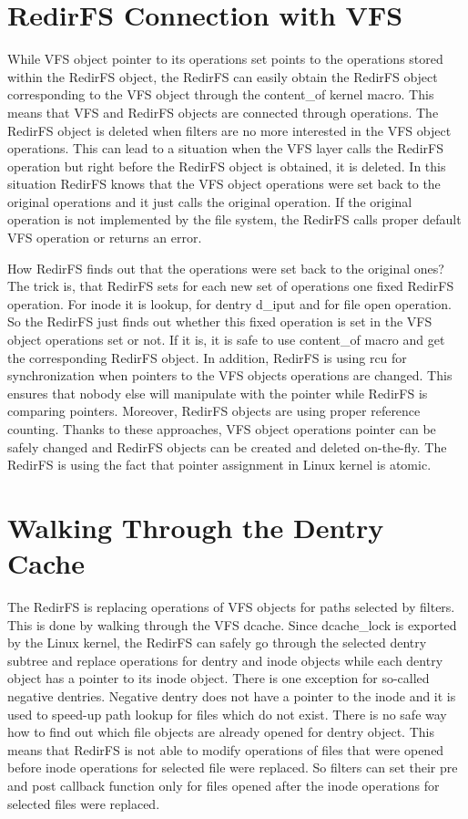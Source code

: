 \documentclass[oneside, 11pt, a4]{article}
\begin{document}
\section{RedirFS Connection with VFS}
While VFS object pointer to its operations set points to the operations stored
within the RedirFS object, the RedirFS can easily obtain the RedirFS object
corresponding to the VFS object through the content\_of kernel macro. This means
that VFS and RedirFS objects are connected through operations. The RedirFS
object is deleted when filters are no more interested in the VFS object
operations. This can lead to a situation when the VFS layer calls the RedirFS
operation but right before the RedirFS object is obtained, it is deleted. In
this situation RedirFS knows that the VFS object operations were set back to the
original operations and it just calls the original operation. If the original
operation is not implemented by the file system, the RedirFS calls proper
default VFS operation or returns an error.

How RedirFS finds out that the operations were set back to the original ones?
The trick is, that RedirFS sets for each new set of operations one fixed RedirFS
operation. For inode it is lookup, for dentry d\_iput and for file open
operation. So the RedirFS just finds out whether this fixed operation is set in
the VFS object operations set or not. If it is, it is safe to use content\_of
macro and get the corresponding RedirFS object. In addition, RedirFS is using
rcu for synchronization when pointers to the VFS objects operations are changed.
This ensures that nobody else will manipulate with the pointer while RedirFS is
comparing pointers. Moreover, RedirFS objects are using proper reference
counting. Thanks to these approaches, VFS object operations pointer can be
safely changed and RedirFS objects can be created and deleted on-the-fly. The
RedirFS is using the fact that pointer assignment in Linux kernel is atomic.

\section{Walking Through the Dentry Cache}
The RedirFS is replacing operations of VFS objects for paths selected by
filters. This is done by walking through the VFS dcache. Since dcache\_lock is
exported by the Linux kernel, the RedirFS can safely go through the selected
dentry subtree and replace operations for dentry and inode objects while each
dentry object has a pointer to its inode object. There is one exception for
so-called negative dentries. Negative dentry does not have a pointer to the
inode and it is used to speed-up path lookup for files which do not exist. There
is no safe way how to find out which file objects are already opened for dentry
object. This means that RedirFS is not able to modify operations of files that
were opened before inode operations for selected file were replaced. So filters
can set their pre and post callback function only for files opened after the
inode operations for selected files were replaced.
\end{document}
